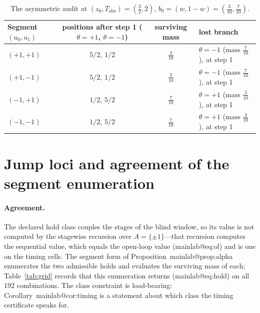 \documentclass[11pt,a4paper]{article}
\makeatletter
\theoremstyle{plain}
\theoremstyle{definition}
\theoremstyle{remark}
\newcommand{\Tobs}{T_{\mathrm{obs}}}
\newcommand{\tfr}[2]{\tfrac{#1}{#2}}
\newcommand{\mref}[1]{\csname mainlab@#1\endcsname}
\newcommand{\meqref}[1]{(\mref{#1})}
\makeatother
\begin{document}
\begin{table}[h]
\centering\footnotesize
\caption{The asymmetric audit at $(z_0,\Tobs)=(\tfr32,2)$, $b_0=(w,1-w)=(\tfr3{10},\tfr7{10})$.}
\label{tab:asym}
\begin{tabular}{@{}l c c l@{}}
\toprule
Segment $(u_0,u_1)$ & positions after step 1 ($\theta=+1$, $\theta=-1$) & surviving mass & lost branch\\
\midrule
$(+1,+1)$ & $5/2$, $1/2$ & $\tfrac{3}{10}$ & $\theta=-1$ (mass $\tfrac{7}{10}$), at step 1\\
$(+1,-1)$ & $5/2$, $1/2$ & $\tfrac{3}{10}$ & $\theta=-1$ (mass $\tfrac{7}{10}$), at step 1\\
$(-1,+1)$ & $1/2$, $5/2$ & $\tfrac{7}{10}$ & $\theta=+1$ (mass $\tfrac{3}{10}$), at step 1\\
$(-1,-1)$ & $1/2$, $5/2$ & $\tfrac{7}{10}$ & $\theta=+1$ (mass $\tfrac{3}{10}$), at step 1\\
\bottomrule
\end{tabular}
\end{table}
\section{Jump loci and agreement of the segment enumeration}\label{si:loci}

\paragraph{Agreement.} The declared hold class couples the stages of the blind window, so its value is not computed by the stagewise recursion over $A=\{\pm1\}$---that recursion computes the sequential value, which equals the open-loop value \meqref{eq:ol} and is one on the timing cells. The segment form of Proposition~\mref{prop:alpha} enumerates the two admissible holds and evaluates the surviving mass of each; Table~\ref{tab:grid} records that this enumeration returns \meqref{eq:hold} on all $192$ combinations. The class constraint is load-bearing: Corollary~\mref{cor:timing} is a statement about which class the timing certificate speaks for.
\end{document}
